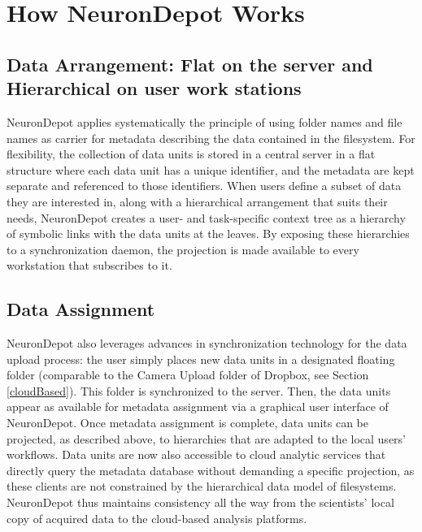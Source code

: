 \documentclass{frontiersSCNS} %
\begin{document}

\section{How NeuronDepot Works}

\subsection{Data Arrangement: Flat on the server and Hierarchical on user work
stations}

NeuronDepot applies systematically the principle of using folder names and file
names as carrier for metadata describing the data contained in the filesystem.
For flexibility, the collection of data units is stored in a central server in
a flat structure where each data unit has a unique identifier, and the metadata
are kept separate and referenced to those identifiers. When users define a
subset of data they are interested in, along with a hierarchical arrangement
that suits their needs, NeuronDepot creates a user- and task-specific context
tree as a hierarchy of symbolic links with the data units at the leaves. By
exposing these hierarchies to a synchronization daemon, the projection is made
available to every workstation that subscribes to it.

\subsection{Data Assignment}

NeuronDepot also leverages advances in synchronization technology for the data
upload process: the user simply places new data units in a designated floating
folder (comparable to the Camera Upload folder of Dropbox, see Section
\ref{cloudBased}). This folder is
synchronized to the server. Then, the data units appear as available for
metadata assignment via a graphical user interface of NeuronDepot. Once
metadata assignment is complete, data units can be projected, as described
above, to hierarchies that are adapted to the local users' workflows. Data
units are now also accessible to cloud analytic services that directly query
the metadata database without demanding a specific projection, as these clients
are not constrained by the hierarchical data model of filesystems. NeuronDepot
thus maintains consistency all the way from the scientists' local copy of
acquired data to the cloud-based analysis platforms.
\end{document}
